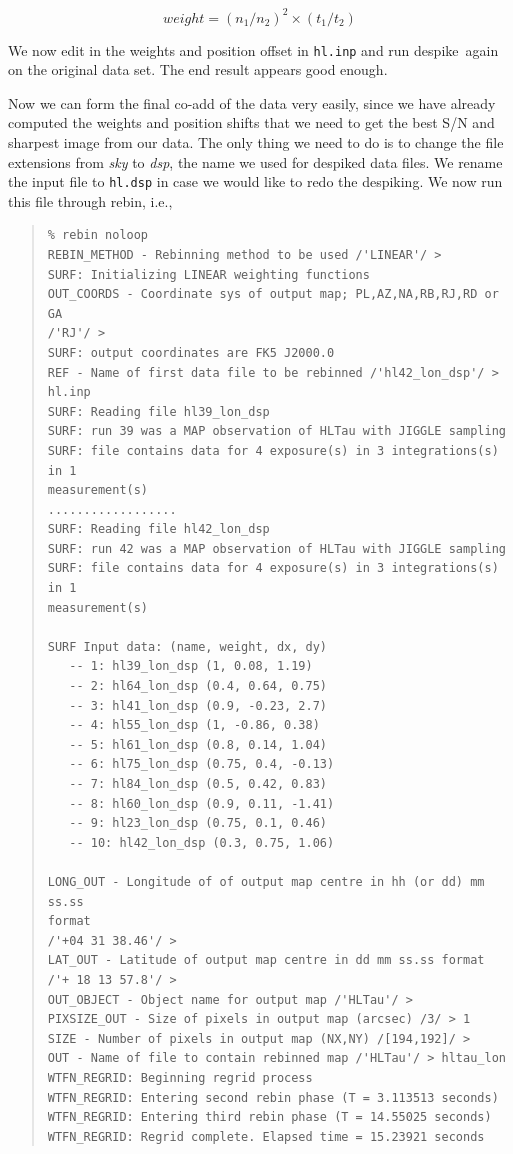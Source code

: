 \documentclass[twoside,11pt]{article}
\newenvironment{myquote}{\begin{quote}\begin{small}}{\end{small}\end{quote}}
\newcommand{\task}[1]{\textsf{#1}}
\newcommand{\rebin}{\xref{\task{rebin}}{sun216}{REBIN}}
\newcommand{\desp}{\xref{\task{despike}}{sun216}{DESPIKE}}
\newcommand{\xref}[3]{#1}
\renewcommand{\_}{\texttt{\symbol{95}}}
\begin{document}
\begin{equation} weight = (n_1/n_2)^2\times(t_1/t_2) \end{equation}

\noindent
We now edit in the weights and position offset in \texttt{hl.inp} and
run \desp\ again on the original data set.  The end result appears
good enough.

Now we can form the final co-add of the data very easily, since we
have already computed the weights and position shifts that we need to
get the best S/N and sharpest image from our data.  The only thing we
need to do is to change the file extensions from {\it sky} to {\it
dsp}, the name we used for despiked data files.  We rename the input
file to \texttt{hl.dsp} in case we would like to redo the despiking.
We now run this file through \rebin, i.e.,


\begin{myquote}
\begin{verbatim}
% rebin noloop
REBIN_METHOD - Rebinning method to be used /'LINEAR'/ >
SURF: Initializing LINEAR weighting functions
OUT_COORDS - Coordinate sys of output map; PL,AZ,NA,RB,RJ,RD or GA
/'RJ'/ >
SURF: output coordinates are FK5 J2000.0
REF - Name of first data file to be rebinned /'hl42_lon_dsp'/ >
hl.inp
SURF: Reading file hl39_lon_dsp
SURF: run 39 was a MAP observation of HLTau with JIGGLE sampling
SURF: file contains data for 4 exposure(s) in 3 integrations(s) in 1
measurement(s)
..................
SURF: Reading file hl42_lon_dsp
SURF: run 42 was a MAP observation of HLTau with JIGGLE sampling
SURF: file contains data for 4 exposure(s) in 3 integrations(s) in 1
measurement(s)

SURF Input data: (name, weight, dx, dy)
   -- 1: hl39_lon_dsp (1, 0.08, 1.19)
   -- 2: hl64_lon_dsp (0.4, 0.64, 0.75)
   -- 3: hl41_lon_dsp (0.9, -0.23, 2.7)
   -- 4: hl55_lon_dsp (1, -0.86, 0.38)
   -- 5: hl61_lon_dsp (0.8, 0.14, 1.04)
   -- 6: hl75_lon_dsp (0.75, 0.4, -0.13)
   -- 7: hl84_lon_dsp (0.5, 0.42, 0.83)
   -- 8: hl60_lon_dsp (0.9, 0.11, -1.41)
   -- 9: hl23_lon_dsp (0.75, 0.1, 0.46)
   -- 10: hl42_lon_dsp (0.3, 0.75, 1.06)

LONG_OUT - Longitude of of output map centre in hh (or dd) mm ss.ss
format
/'+04 31 38.46'/ >
LAT_OUT - Latitude of output map centre in dd mm ss.ss format
/'+ 18 13 57.8'/ >
OUT_OBJECT - Object name for output map /'HLTau'/ >
PIXSIZE_OUT - Size of pixels in output map (arcsec) /3/ > 1
SIZE - Number of pixels in output map (NX,NY) /[194,192]/ >
OUT - Name of file to contain rebinned map /'HLTau'/ > hltau_lon
WTFN_REGRID: Beginning regrid process
WTFN_REGRID: Entering second rebin phase (T = 3.113513 seconds)
WTFN_REGRID: Entering third rebin phase (T = 14.55025 seconds)
WTFN_REGRID: Regrid complete. Elapsed time = 15.23921 seconds
\end{verbatim}
\end{myquote}
\end{document}

